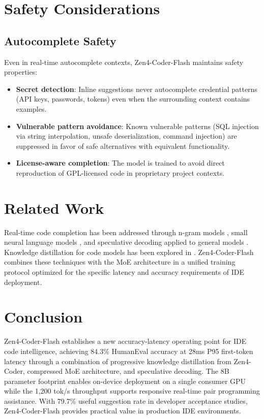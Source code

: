 \documentclass[11pt,a4paper]{article}
\begin{document}
\section{Safety Considerations}

\subsection{Autocomplete Safety}

Even in real-time autocomplete contexts, Zen4-Coder-Flash maintains safety properties:

\begin{itemize}
  \item \textbf{Secret detection}: Inline suggestions never autocomplete credential patterns (API keys, passwords, tokens) even when the surrounding context contains examples.
  \item \textbf{Vulnerable pattern avoidance}: Known vulnerable patterns (SQL injection via string interpolation, unsafe deserialization, command injection) are suppressed in favor of safe alternatives with equivalent functionality.
  \item \textbf{License-aware completion}: The model is trained to avoid direct reproduction of GPL-licensed code in proprietary project contexts.
\end{itemize}

\section{Related Work}

Real-time code completion has been addressed through n-gram models \cite{ngram}, small neural language models \cite{codewhisperer}, and speculative decoding applied to general models \cite{speculative,specinfer}. Knowledge distillation for code models has been explored in \cite{codistil}. Zen4-Coder-Flash combines these techniques with the MoE architecture in a unified training protocol optimized for the specific latency and accuracy requirements of IDE deployment.

\section{Conclusion}

Zen4-Coder-Flash establishes a new accuracy-latency operating point for IDE code intelligence, achieving 84.3\% HumanEval accuracy at 28ms P95 first-token latency through a combination of progressive knowledge distillation from Zen4-Coder, compressed MoE architecture, and speculative decoding. The 8B parameter footprint enables on-device deployment on a single consumer GPU while the 1,200 tok/s throughput supports responsive real-time pair programming assistance. With 79.7\% useful suggestion rate in developer acceptance studies, Zen4-Coder-Flash provides practical value in production IDE environments.
\end{document}
